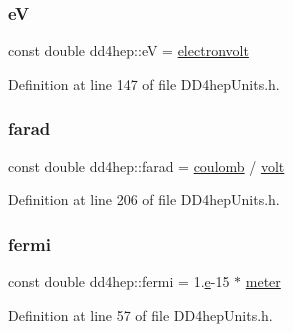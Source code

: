 \hypertarget{namespacedd4hep_a17b06ecf4141c435b68b9873d0474460}{}\label{namespacedd4hep_a17b06ecf4141c435b68b9873d0474460} 
\subsubsection{\texorpdfstring{eV}{eV}}
{\footnotesize\ttfamily const double dd4hep\+::eV = \hyperlink{namespacedd4hep_a849fe8dd27af5a22a8d7891687a4d499}{electronvolt}\hspace{0.3cm}{\ttfamily [static]}}



Definition at line 147 of file D\+D4hep\+Units.\+h.

\hypertarget{namespacedd4hep_a520a532361cb9086c6d4c69ac195ddba}{}\label{namespacedd4hep_a520a532361cb9086c6d4c69ac195ddba} 
\subsubsection{\texorpdfstring{farad}{farad}}
{\footnotesize\ttfamily const double dd4hep\+::farad = \hyperlink{namespacedd4hep_a399f2340c615066766d822ce9c9781b7}{coulomb} / \hyperlink{namespacedd4hep_a1bbac6ed4a69b41427c9a44a513e2500}{volt}\hspace{0.3cm}{\ttfamily [static]}}



Definition at line 206 of file D\+D4hep\+Units.\+h.

\hypertarget{namespacedd4hep_ab70812b84cbdb9ab6090547c4b237abb}{}\label{namespacedd4hep_ab70812b84cbdb9ab6090547c4b237abb} 
\subsubsection{\texorpdfstring{fermi}{fermi}}
{\footnotesize\ttfamily const double dd4hep\+::fermi = 1.\hyperlink{_volumes_8cpp_a8a9a1f93e9b09afccaec215310e64142}{e}-\/15 $\ast$ \hyperlink{namespacedd4hep_a46f5cf0231796af4296a307a58812b06}{meter}\hspace{0.3cm}{\ttfamily [static]}}



Definition at line 57 of file D\+D4hep\+Units.\+h.

\hypertarget{namespacedd4hep_aa979b30c6c7f9ba61132327d4584bfde}{}\label{namespacedd4hep_aa979b30c6c7f9ba61132327d4584bfde} 
